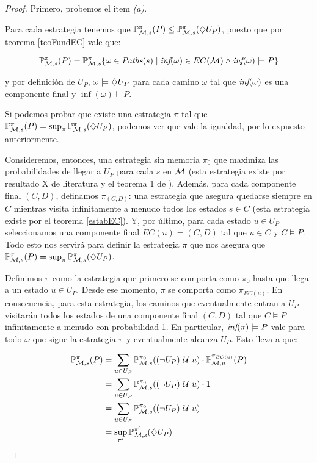 \begin{proof}
	Primero, probemos el item \textit{(a)}.

	Para cada estrategia tenemos que $\mathbb{P}_{\mathcal{M}, s}^\pi(P) \leq \mathbb{P}_{\mathcal{M}, s}^\pi(\diamondsuit U_P)$,
	puesto que por teorema \ref{teoFundEC} vale que:

	$$
		\mathbb{P}_{\mathcal{M}, s}^\pi(P) = \mathbb{P}_{\mathcal{M}, s}^\pi\{\omega \in \textit{Paths}(s) \mid \textit{inf}(\omega) \in EC(\mathcal{M}) \wedge \textit{inf}(\omega) \models P\}
	$$

	y por definición de $U_P$, $\omega \models \diamondsuit U_P$ para cada camino $\omega$
	tal que $\textit{inf}(\omega)$ es una componente final y $\inf(\omega) \models P$.

	Si podemos probar que existe una estrategia $\pi$ tal que $\mathbb{P}_{\mathcal{M}, s}^\pi(P) =
		\sup_{\pi} \mathbb{P}_{\mathcal{M}, s}^\pi(\diamondsuit U_P)$, podemos ver que vale la igualdad, por lo
	expuesto anteriormente.

	Consideremos, entonces, una estrategia sin memoria $\pi_0$ que maximiza las
	probabilidades de llegar a $U_P$ para cada $s$ en $\mathcal{M}$ (esta estrategia existe
	por resultado X de literatura y el teorema 1 de \cite{Polytopal}). Además, para
	cada componente final $(C,D)$, definamos $\pi_{(C, D)}$: una estrategia que
	asegura quedarse siempre en $C$ mientras visita infinitamente a menudo todos
	los estados $s \in C$ (esta estrategia existe por el teorema \ref{estabEC}). Y,
	por último, para cada estado $u \in U_P$ seleccionamos una componente final
	$EC(u) = (C,D)$ tal que $u \in C$ y $C \models P$. Todo esto nos servirá para
	definir la estrategia $\pi$ que nos asegura que $\mathbb{P}_{\mathcal{M}, s}^\pi(P) = \sup_{\pi}
		\mathbb{P}_{\mathcal{M}, s}^\pi(\diamondsuit U_P)$.

	Definimos $\pi$ como la estrategia que primero se comporta como $\pi_0$ hasta
	que llega a un estado $u \in U_P$. Desde ese momento, $\pi$ se comporta como
	$\pi_{EC(u)}$. En consecuencia, para esta estrategia, los caminos que
	eventualmente entran a $U_P$ visitarán todos los estados de una componente
	final $(C,D)$ tal que $C \models P$ infinitamente a menudo con probabilidad 1.
	En particular, $\textit{inf}(\pi) \models P$ vale para todo $\omega$ que sigue la
	estrategia $\pi$ y eventualmente alcanza $U_P$. Esto lleva a que:

	\begin{align*}
		\mathbb{P}_{\mathcal{M}, s}^\pi(P) &= \sum_{u \in U_P} \mathbb{P}_{\mathcal{M}, s}^{\pi_0} ((\neg U_P) \ \mathcal{U} \  u) \cdot \mathbb{P}_{\mathcal{M}, u}^{\pi_{EC(u)}} (P) \\
		&= \sum_{u \in U_P} \mathbb{P}_{\mathcal{M}, s}^{\pi_0} ((\neg U_P) \ \mathcal{U} \  u) \cdot 1 \\
		&= \sum_{u \in U_P} \mathbb{P}_{\mathcal{M}, s}^{\pi_0} ((\neg U_P) \ \mathcal{U} \  u) \\
		&= \sup_{\pi'} \mathbb{P}_{\mathcal{M}, s}^{\pi'} (\diamondsuit U_P)
	\end{align*}


\end{proof}
